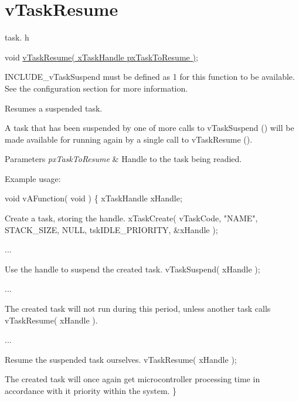 \hypertarget{group__v_task_resume}{\section{v\-Task\-Resume}
\label{group__v_task_resume}
}
task. h 
\begin{DoxyPre}void \hyperlink{win32_2win32_2_libraries_2_free_r_t_o_s_2_source_2tasks_8c_a335663a0881a38ebb6d98c884c84e398}{vTaskResume( xTaskHandle pxTaskToResume )};\end{DoxyPre}


I\-N\-C\-L\-U\-D\-E\-\_\-v\-Task\-Suspend must be defined as 1 for this function to be available. See the configuration section for more information.

Resumes a suspended task.

A task that has been suspended by one of more calls to v\-Task\-Suspend () will be made available for running again by a single call to v\-Task\-Resume ().


\begin{DoxyParams}{Parameters}
{\em px\-Task\-To\-Resume} & Handle to the task being readied.\\
\hline
\end{DoxyParams}
Example usage\-: 
\begin{DoxyPre}
 void vAFunction( void )
 \{
 xTaskHandle xHandle;\end{DoxyPre}



\begin{DoxyPre}Create a task, storing the handle.
         xTaskCreate( vTaskCode, "NAME", STACK\_SIZE, NULL, tskIDLE\_PRIORITY, \&xHandle );\end{DoxyPre}



\begin{DoxyPre}...\end{DoxyPre}



\begin{DoxyPre}Use the handle to suspend the created task.
         vTaskSuspend( xHandle );\end{DoxyPre}



\begin{DoxyPre}...\end{DoxyPre}



\begin{DoxyPre}The created task will not run during this period, unless
another task calls vTaskResume( xHandle ).\end{DoxyPre}



\begin{DoxyPre}...\end{DoxyPre}



\begin{DoxyPre}Resume the suspended task ourselves.
         vTaskResume( xHandle );\end{DoxyPre}



\begin{DoxyPre}The created task will once again get microcontroller processing
time in accordance with it priority within the system.
 \}
   \end{DoxyPre}
 